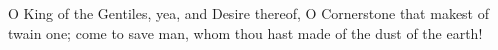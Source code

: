 O King of the Gentiles, yea, and Desire thereof, O Cornerstone that makest of twain one; come to save man, whom thou hast made of the dust of the earth! 